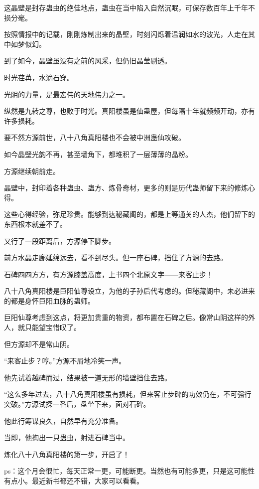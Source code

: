 \begin{this_body}
这晶壁是封存蛊虫的绝佳地点，蛊虫在当中陷入自然沉眠，可保存数百年上千年不损分毫。

按照情报中的记载，刚刚炼制出来的晶壁，时刻闪烁着温润如水的波光，人走在其中如梦似幻。

到了如今，晶壁虽没有之前的风采，但仍旧晶莹剔透。

时光荏苒，水滴石穿。

光阴的力量，是最宏伟的天地伟力之一。

纵然是九转之尊，也败于时光。真阳楼虽是仙蛊屋，但每隔十年就频频开动，亦有许多损耗。

要不然方源前世，八十八角真阳楼也不会被中洲蛊仙攻破。

如今晶壁光韵不再，甚至墙角下，都堆积了一层薄薄的晶粉。

方源继续朝前走。

晶壁中，封印着各种蛊虫、蛊方、炼骨奇材，更多的则是历代蛊师留下来的修炼心得。

这些心得经验，弥足珍贵。能够到达秘藏阁的，都是上等通关的人杰，他们留下的东西根本就差不了。

又行了一段距离后，方源停下脚步。

前方水晶走廊延绵远去，看不到尽头。但一座石碑，挡住了方源的去路。

石碑四四方方，有方源膝盖高度，上书四个北原文字——来客止步！

八十八角真阳楼是巨阳仙尊设立，为他的子孙后代考虑的。但秘藏阁中，未必进来的都是身怀巨阳血脉的蛊师。

巨阳仙尊考虑到这点，将更加贵重的物资，都布置在石碑之后。像常山阴这样的外人，就只能望宝惜叹了。

但方源却不是常山阴。

“来客止步？哼。”方源不屑地冷笑一声。

他先试着越碑而过，结果被一道无形的墙壁挡住去路。

“这么多年过去，八十八角真阳楼虽有损耗，但来客止步碑的功效仍在，不可强行突破。”方源试探一番后，盘坐下来，面对石碑。

他此行筹谋良久，自然早有充分准备。

当即，他掏出一只蛊虫，射进石碑当中。

炼化八十八角真阳楼的第一步，开启了！

ps：这个月会很忙，每天正常一更，可能断更。当然也有可能多更，只是这可能性有点小。最近新书都还不错，大家可以看看。

\end{this_body}

